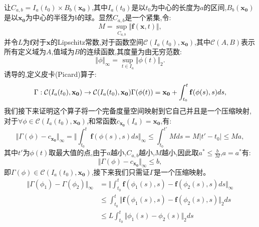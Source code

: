 \begin{pf}
    让$C_{a,b}=I_a(t_0)\times B_b(\mathbf{x_0})$,其中$I_a(t_0)$是以$t_0$为中心的长度为$a$的区间,$B_b(\mathbf{x_0})$是以$\mathbf{x_0}$为中心的半径为$b$的球。显然$C_{a,b}$是一个紧集,令:
    \begin{equation}
        M=\sup_{C_{a,b}}\Vert \mathbf{f}(\mathbf{x},t)\Vert,
    \end{equation}
    并令$L$为$\mathbf{f}$对于$\mathbf{x}$的Lipschitz常数,对于函数空间$\mathcal{C}(I_a(t_0),\mathbf{x_0})$,其中$\mathcal{C}(A,B)$表示所有定义域为$A$,值域为$B$的连续函数,其度量为由无穷范数:
    \begin{equation}
        \Vert\phi\Vert_{\infty}=\sup_{t\in I_a}\Vert\phi(t)\Vert_2.
    \end{equation}
    诱导的,定义皮卡(Picard)算子:
    \begin{equation}
        \Gamma:\mathcal{C}(I_a(t_0),\mathbf{x_0})\to \mathcal{C}(I_a(t_0),\mathbf{x_0})\\
        \Gamma(\phi(t))=\mathbf{x_0}+\int_{t_0}^t\mathbf{f}(\phi(s),s)ds,
    \end{equation}
    我们接下来证明这个算子将一个完备度量空间映射到它自己并且是一个压缩映射,对于$\forall \phi\in\mathcal{C}(I_a(t_0),\mathbf{x_0})$,和常函数$c_{\mathbf{x_0}}(I_a)=\mathbf{x_0}$,有:
    \begin{equation}
        \Vert \Gamma(\phi)-c_{\mathbf{x_0}}\Vert_{\infty}=\Vert\int_{t_0}^t\mathbf{f}(\phi(s),s)ds\Vert_{\infty}\leq \int_{t_0}^{t'}Mds =M|t'-t_0|\leq Ma,
    \end{equation}
    其中$t'$为$\phi(t)$取最大值的点,由于$a$越小,$C_{a,b}$越小,$M$越小,因此取$a^*\leq \frac{b}{M}$,$a=a^*$有:
    \begin{equation}
        \Vert \Gamma(\phi)-c_{\mathbf{x_0}}\Vert_{\infty}\leq b,
    \end{equation}
    即$\Gamma(\phi)\in\mathcal{C}(I_a(t_0),\mathbf{x_0})$,接下来我们只需证$\Gamma$是一个压缩映射。
    \begin{equation}
        \begin{aligned}
            \Vert\Gamma(\phi_1)-\Gamma(\phi_2)\Vert_{\infty} & =\Vert \int_{t_0}^t\mathbf{f}(\phi_1(s),s)-\mathbf{f}(\phi_2(s),s)ds\Vert_{\infty} \\
                                                             & \leq\int_{t_0}^t\Vert\mathbf{f}(\phi_1(s),s)-\mathbf{f}(\phi_2(s),s)\Vert_2 ds     \\
                                                             & \leq L\int_{t_0}^t\Vert \phi_1(s)-\phi_2(s)\Vert_2 ds                              \\

\end{aligned}
\end{equation}
\end{pf}
